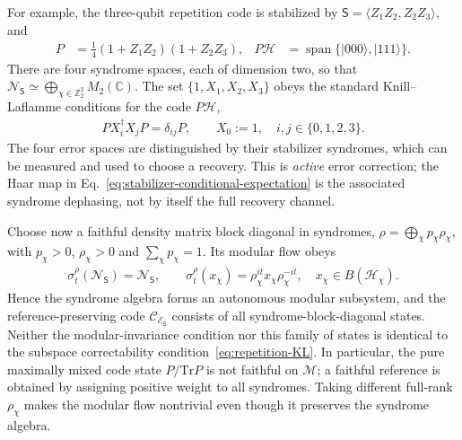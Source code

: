 \documentclass[a4paper,11pt]{article}
\theoremstyle{definition}
\newcommand{\cH}{\mathcal{H}}
\newcommand{\Tr}{\text{Tr}}
\newcommand{\mN}{\mathcal{N}}
\newcommand{\mM}{\mathcal{M}}
\newcommand{\mE}{\mathcal{E}}
\begin{document}
For example, the three-qubit repetition code is stabilized by
$\mathsf S=\langle Z_1Z_2,Z_2Z_3\rangle$, and
\begin{align}
 P&=\tfrac14(1+Z_1Z_2)(1+Z_2Z_3),
 &P\cH&=\operatorname{span}\{|000\rangle,|111\rangle\}.
 \label{eq:three-qubit-code}
\end{align}
There are four syndrome spaces, each of dimension two, so that
$\mN_{\mathsf S}\simeq\bigoplus_{\chi\in\mathbb Z_2^2}M_2(\mathbb C)$.
The set $\{1,X_1,X_2,X_3\}$ obeys the standard Knill--Laflamme
conditions for the code $P\cH$,
\begin{align}
 P X_i^\dagger X_jP=\delta_{ij}P,
 \qquad X_0:=1,
 \quad i,j\in\{0,1,2,3\} .
 \label{eq:repetition-KL}
\end{align}
The four error spaces are distinguished by their stabilizer syndromes,
which can be measured and used to choose a recovery. This is \emph{active}
error correction; the Haar map in
Eq.~\eqref{eq:stabilizer-conditional-expectation} is the associated
syndrome dephasing, not by itself the full recovery channel.

Choose now a faithful density matrix block diagonal in syndromes,
$\rho=\bigoplus_\chi p_\chi\rho_\chi$, with
$p_\chi>0$, $\rho_\chi>0$ and $\sum_\chi p_\chi=1$. Its modular
flow obeys
\begin{align}
 \sigma_t^\rho(\mN_{\mathsf S})=\mN_{\mathsf S},
 \qquad
 \sigma_t^\rho(x_\chi)=\rho_\chi^{it}x_\chi\rho_\chi^{-it},
 \quad x_\chi\in B(\cH_\chi).
 \label{eq:stabilizer-modular-flow}
\end{align}
Hence the syndrome algebra forms an autonomous modular subsystem, and
the reference-preserving code $\mathcal C_{\mE_{\mathsf S}}$ consists of
all syndrome-block-diagonal states. Neither the modular-invariance
condition nor this family of states is identical to the subspace
correctability condition~\eqref{eq:repetition-KL}. In particular, the
pure maximally mixed code state $P/\Tr P$ is not faithful on $\mM$; a
faithful reference is obtained by assigning positive weight to all
syndromes. Taking different full-rank $\rho_\chi$ makes the modular
flow nontrivial even though it preserves the syndrome algebra.
\end{document}
